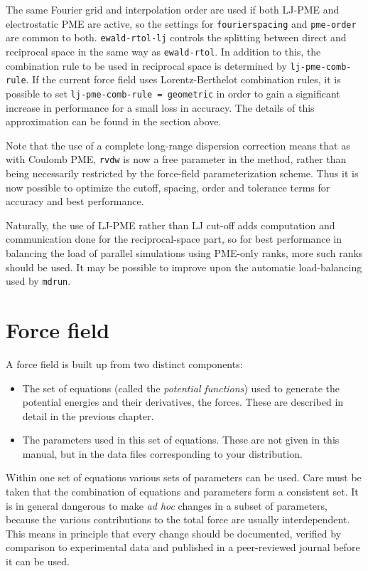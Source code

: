The same Fourier grid and interpolation order are used if both
LJ-PME and electrostatic PME are active, so the settings for
{\tt fourierspacing} and {\tt pme-order} are common to both.
{\tt ewald-rtol-lj} controls the
splitting between direct and reciprocal space in the same way as
{\tt ewald-rtol}.  In addition to this, the combination rule to be used
in reciprocal space is determined by {\tt lj-pme-comb-rule}. If the
current force field uses Lorentz-Berthelot combination rules, it is
possible to set {\tt lj-pme-comb-rule = geometric} in order to gain a
significant increase in performance for a small loss in accuracy. The
details of this approximation can be found in the section above.

Note that the use of a complete long-range dispersion correction means
that as with Coulomb PME, {\tt rvdw} is now a free parameter in the
method, rather than being necessarily restricted by the force-field
parameterization scheme. Thus it is now possible to optimize the
cutoff, spacing, order and tolerance terms for accuracy and best
performance.

Naturally, the use of LJ-PME rather than LJ cut-off adds computation
and communication done for the reciprocal-space part, so for best
performance in balancing the load of parallel simulations using
PME-only ranks, more such ranks should be used. It may be possible to
improve upon the automatic load-balancing used by {\tt mdrun}.


\section{Force field}
\label{sec:ff}
A force field is built up from two distinct components:
\begin{itemize}
\item The set of equations (called the {\em
potential functions}) used to generate the potential
  energies and their derivatives, the forces. These are described in
  detail in the previous chapter.
\item The parameters used in this set of equations. These are not
  given in this manual, but in the data files corresponding to your
  {\gromacs} distribution.
\end{itemize}
Within one set of equations various sets of parameters can be
used. Care must be taken that the combination of equations and
parameters form a consistent set. It is in general dangerous to make
{\em ad hoc} changes in a subset of parameters, because the various
contributions to the total force are usually interdependent. This
means in principle that every change should be documented, verified by
comparison to experimental data and published in a peer-reviewed
journal before it can be used.

